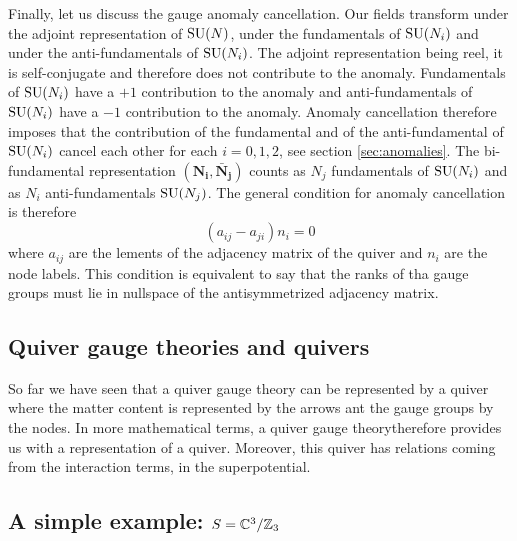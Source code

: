         Finally, let us discuss the gauge anomaly cancellation. Our fields transform under the adjoint representation of $\text{SU}(N)$, under the fundamentals of $\text{SU}(N_i)$ and under the anti-fundamentals of $\text{SU}(N_i)$. The adjoint representation being reel, it is self-conjugate and therefore does not contribute to the anomaly. Fundamentals of $\text{SU}(N_i)$ have a $+1$ contribution to the anomaly and anti-fundamentals of $\text{SU}(N_i)$ have a $-1$ contribution to the anomaly. Anomaly cancellation therefore imposes that the contribution of the fundamental and of the anti-fundamental of $\text{SU}(N_i)$ cancel each other for each $i=0,1,2$, see section \eqref{sec:anomalies}. The bi-fundamental representation $(\boldsymbol{\textbf{N}_i},\boldsymbol{\bar{\textbf{N}}_j})$ counts as $N_j$ fundamentals of $\text{SU}(N_i)$ and as $N_i$ anti-fundamentals $\text{SU}(N_j)$. The general condition for anomaly cancellation is therefore
        \begin{equation}
            \boxed{(a_{ij}-a_{ji})n_i=0}
        \end{equation}
        where $a_{ij}$ are the lements of the adjacency matrix of the quiver and $n_i$ are the node labels. This condition is equivalent to say that the ranks of tha gauge groups must lie in nullspace of the antisymmetrized adjacency matrix.

    \subsection{Quiver gauge theories and quivers}

        So far we have seen that a quiver gauge theory can be represented by a quiver where the matter content is represented by the arrows ant the gauge groups by the nodes. In more mathematical terms, a quiver gauge theorytherefore provides us with a representation of a quiver. Moreover, this quiver has relations coming from the interaction terms, in the superpotential.\marker

    \subsection{A simple example: $S=\mathbb{C}^3/\mathbb{Z}_3$}\label{sec:C3Z3}

